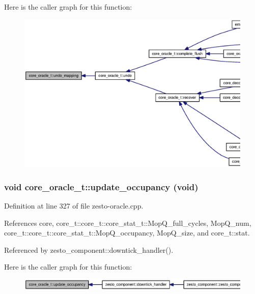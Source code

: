 Here is the caller graph for this function:\nopagebreak
\begin{figure}[H]
\begin{center}
\leavevmode
\includegraphics[width=420pt]{classcore__oracle__t_dc47fe294aeba52e39f9a11276522823_icgraph}
\end{center}
\end{figure}
\subsubsection[{update\_\-occupancy}]{\setlength{\rightskip}{0pt plus 5cm}void core\_\-oracle\_\-t::update\_\-occupancy (void)}\label{classcore__oracle__t_494a10decdeba4a3f043cce0186d806a}




Definition at line 327 of file zesto-oracle.cpp.

References core, core\_\-t::core\_\-t::core\_\-stat\_\-t::MopQ\_\-full\_\-cycles, MopQ\_\-num, core\_\-t::core\_\-t::core\_\-stat\_\-t::MopQ\_\-occupancy, MopQ\_\-size, and core\_\-t::stat.

Referenced by zesto\_\-component::downtick\_\-handler().

Here is the caller graph for this function:\nopagebreak
\begin{figure}[H]
\begin{center}
\leavevmode
\includegraphics[width=352pt]{classcore__oracle__t_494a10decdeba4a3f043cce0186d806a_icgraph}
\end{center}
\end{figure}


